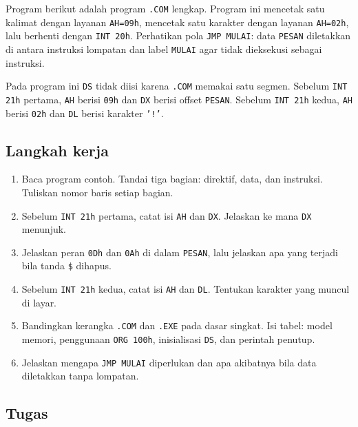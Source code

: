 Program berikut adalah program \texttt{.COM} lengkap. Program ini
mencetak satu kalimat dengan layanan \texttt{AH=09h}, mencetak satu
karakter dengan layanan \texttt{AH=02h}, lalu berhenti dengan
\texttt{INT 20h}. Perhatikan pola \texttt{JMP MULAI}: data
\texttt{PESAN} diletakkan di antara instruksi lompatan dan label
\texttt{MULAI} agar tidak dieksekusi sebagai instruksi.



Pada program ini \texttt{DS} tidak diisi karena \texttt{.COM}
memakai satu segmen. Sebelum \texttt{INT 21h} pertama,
\texttt{AH} berisi \texttt{09h} dan \texttt{DX} berisi offset
\texttt{PESAN}. Sebelum \texttt{INT 21h} kedua, \texttt{AH} berisi
\texttt{02h} dan \texttt{DL} berisi karakter \texttt{'!'}.

\subsection{Langkah kerja}

\begin{enumerate}
    \item Baca program contoh. Tandai tiga bagian: direktif,
          data, dan instruksi. Tuliskan nomor baris setiap bagian.
    \item Sebelum \texttt{INT 21h} pertama, catat isi \texttt{AH} dan
          \texttt{DX}. Jelaskan ke mana \texttt{DX} menunjuk.
    \item Jelaskan peran \texttt{0Dh} dan \texttt{0Ah} di dalam
          \texttt{PESAN}, lalu jelaskan apa yang terjadi bila tanda
          \texttt{\$} dihapus.
    \item Sebelum \texttt{INT 21h} kedua, catat isi \texttt{AH} dan
          \texttt{DL}. Tentukan karakter yang muncul di layar.
    \item Bandingkan kerangka \texttt{.COM} dan \texttt{.EXE} pada
          dasar singkat. Isi tabel: model memori, penggunaan
          \texttt{ORG 100h}, inisialisasi \texttt{DS}, dan perintah
          penutup.
    \item Jelaskan mengapa \texttt{JMP MULAI} diperlukan dan apa
          akibatnya bila data diletakkan tanpa lompatan.
\end{enumerate}

\subsection{Tugas}

